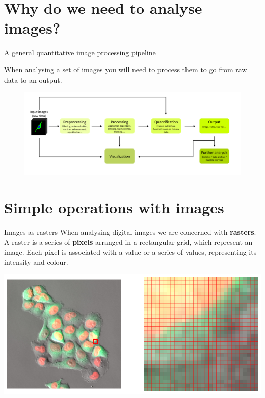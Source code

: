 \documentclass[9pt, aspectratio=169]{beamer}
\begin{document}
\section{Why do we need to analyse images?}

\begin{frame}
    {A general quantitative image processing pipeline}

    When analysing a set of images you will need to process them to go from raw data to an output.

    \begin{figure}
        \centering
        \includegraphics[width=\textwidth]{pipeline.png}
    \end{figure}

\end{frame}

\section{Simple operations with images}

\begin{frame}
{Images as rasters}
When analysing digital images we are concerned with \textbf{rasters}.\\
A raster is a series of \textbf{pixels} arranged in a rectangular grid, which represent an image. Each pixel is associated with a value or a series of values, representing its intensity and colour.
\begin{center}
    \includegraphics[width=.8\textwidth]{raster.png}
\end{center}
\end {frame}
\end{document}
